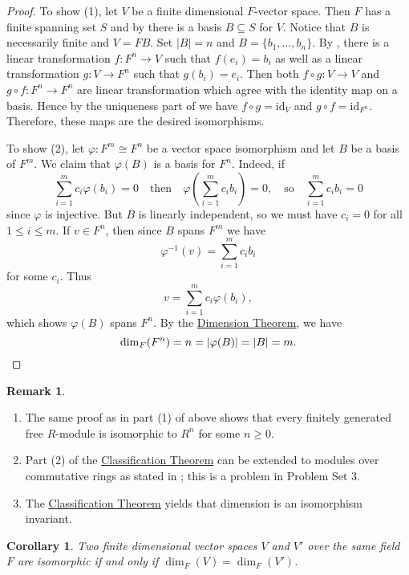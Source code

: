 \documentclass[12pt]{report}
\newtheorem{corollary}[theorem]{Corollary}
\numberwithin{equation}{section}
\numberwithin{theorem}{chapter}
\theoremstyle{definition}
\newtheorem*{basic properties}{Basic Properties}
\newtheorem*{Important Remark}{Important Remark}
\newtheorem{remark}[theorem]{Remark}
\begin{document}
\begin{proof}
To show (1), let $V$ be a finite dimensional $F$-vector space. Then $F$ has a finite spanning set $S$ and by  there is a basis $B\subseteq S$ for $V$. Notice that $B$ is necessarily finite and $V=FB$. Set $|B|=n$ and $B=\{b_1,\ldots,b_n\}$. By , there is a linear transformation $f\!:F^n\to V$ such that $f(e_i)=b_i$ as well as a linear transformation $g\!:V\to F^n$ such that $g(b_i)=e_i$. Then both $f\circ g:V\to V$ and $g\circ f:F^n\to F^n$ are linear transformation which agree with the identity map on a basis. Hence by the uniqueness part of  we have $f\circ g=\mathrm{id}_V$ and $g\circ f=\mathrm{id}_{F^n}$. 
Therefore, these maps are the desired isomorphisms.

To show (2), let $\varphi:F^m\cong F^n$ be a vector space isomorphism and let $B$ be a basis of $F^m$.  We claim that $\varphi(B)$ is a basis for $F^n$. Indeed, if 
$$\sum_{i=1}^mc_i\varphi(b_i)=0 \quad \textrm{then} \quad \varphi \left(\sum_{i=1}^mc_ib_i \right)=0,
\quad \textrm{so} \quad \sum_{i=1}^mc_ib_i=0$$ 
since $\varphi$ is injective. But $B$ is linearly independent, so we must have $c_i=0$ for all $1 \leqslant i \leqslant m$. If $v\in F^n$, then since $B$ spans $F^m$ we have
$$\varphi^{-1}(v)=\sum_{i=1}^mc_ib_i$$
for some $c_i$. Thus 
$$v=\sum_{i=1}^mc_i\varphi(b_i),$$
which shows $\varphi(B)$ spans $F^n$.
By the \hyperref[thm1116a]{Dimension Theorem}, we have 
$$\dim_F(F^n)=n=|\varphi(B)|=|B|=m.\qedhere$$
\end{proof}


\begin{remark} $\,$
\begin{enumerate}[label=(\arabic*),itemsep=0mm]
\item The same proof as in part (1) of  above shows that every finitely generated free $R$-module is isomorphic to $R^n$ for some $n \geqslant 0$.
\item Part (2) of the \hyperref[classification of fg vector spaces]{Classification Theorem} can be extended to modules over commutative rings as stated in ; this is a problem in Problem Set 3.
\item The \hyperref[classification of fg vector spaces]{Classification Theorem} yields that dimension is an isomorphism invariant.
\end{enumerate}
\end{remark}

\begin{corollary}
Two finite dimensional vector spaces $V$ and $V'$ over the same field $F$ are isomorphic if and only if $\dim_F(V) = \dim_F(V')$.
\end{corollary}
\end{document}
